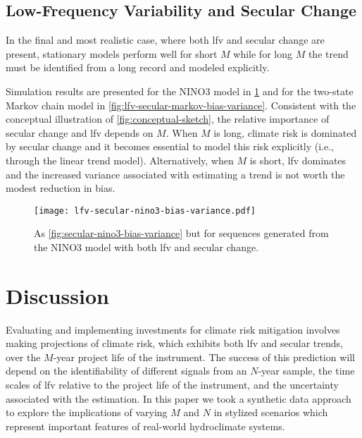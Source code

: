 \documentclass[
]{agujournal2018}
\makeatletter
\newcommand{\ie}{i.e.\@\xspace}
\makeatother
\begin{document}
\subsection{Low-Frequency Variability and Secular Change}

In the final and most realistic case, where both \gls{lfv} and secular change are present, stationary models perform well for short $M$ while for long $M$ the trend must be identified from a long record and modeled explicitly.

Simulation results are presented for the NINO3 model in \cref{fig:lfv-secular-nino3-bias-variance} and for the two-state Markov chain model in \cref{fig:lfv-secular-markov-bias-variance}.
Consistent with the conceptual illustration of \cref{fig:conceptual-sketch}, the relative importance of secular change and \gls{lfv} depends on $M$.
When $M$ is long, climate risk is dominated by secular change and it becomes essential to model this risk explicitly (\ie, through the linear trend model).
Alternatively, when $M$ is short, \gls{lfv} dominates and the increased variance associated with estimating a trend is not worth the modest reduction in bias.
\begin{figure}
  \centering
  \texttt{[image: lfv-secular-nino3-bias-variance.pdf]}
  \caption{
    As \cref{fig:secular-nino3-bias-variance} but for sequences generated from the NINO3 model with both \gls{lfv} and secular change.
  }\label{fig:lfv-secular-nino3-bias-variance}
\end{figure}


\clearpage
\section{Discussion}\label{sec:discussion-conclusions}

Evaluating and implementing investments for climate risk mitigation involves making projections of climate risk, which exhibits both \gls{lfv} and secular trends, over the $M$-year project life of the instrument.
The success of this prediction will depend on the identifiability of different signals from an $N$-year sample, the time scales of \gls{lfv} relative to the project life of the instrument, and the uncertainty associated with the estimation.
In this paper we took a synthetic data approach to explore the implications of varying $M$ and $N$ in stylized scenarios which represent important features of real-world hydroclimate systems.
\end{document}
